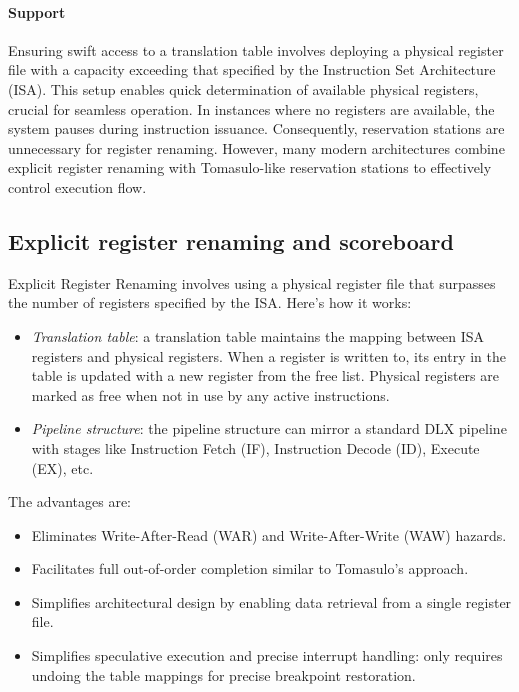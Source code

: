 \paragraph*{Support}
Ensuring swift access to a translation table involves deploying a physical register file with a capacity exceeding that specified by the Instruction Set Architecture (ISA).
This setup enables quick determination of available physical registers, crucial for seamless operation. 
In instances where no registers are available, the system pauses during instruction issuance. 
Consequently, reservation stations are unnecessary for register renaming. 
However, many modern architectures combine explicit register renaming with Tomasulo-like reservation stations to effectively control execution flow.

\subsection{Explicit register renaming and scoreboard}
Explicit Register Renaming involves using a physical register file that surpasses the number of registers specified by the ISA. 
Here's how it works:
\begin{itemize}
    \item \textit{Translation table}: a translation table maintains the mapping between ISA registers and physical registers. 
        When a register is written to, its entry in the table is updated with a new register from the free list. 
        Physical registers are marked as free when not in use by any active instructions.
    \item \textit{Pipeline structure}: the pipeline structure can mirror a standard DLX pipeline with stages like Instruction Fetch (IF), Instruction Decode (ID), Execute (EX), etc. 
\end{itemize}
The advantages are: 
\begin{itemize}
    \item Eliminates Write-After-Read (WAR) and Write-After-Write (WAW) hazards.
    \item Facilitates full out-of-order completion similar to Tomasulo's approach.
    \item Simplifies architectural design by enabling data retrieval from a single register file.
    \item Simplifies speculative execution and precise interrupt handling: only requires undoing the table mappings for precise breakpoint restoration.
\end{itemize}

